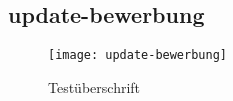 \begin{landscape}
\subsection{update-bewerbung}
\label{section-update-bewerbung}
\begin{figure}[H]
    \centering
    \caption{Testüberschrift}
    \begin{adjustbox}{width=\linewidth, center}
        \texttt{[image: update-bewerbung]}
    \end{adjustbox}
\end{figure}

\end{landscape}
